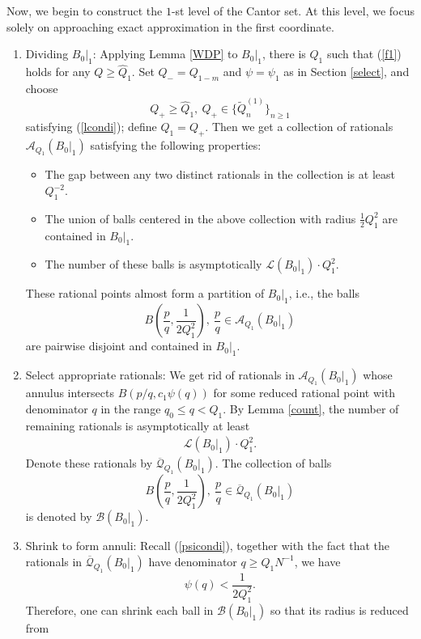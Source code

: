 \documentclass[11pt]{amsart}
\numberwithin{equation}{section}
\newcommand{\0}{\mathbf{0}}
\theoremstyle{remark}
\begin{document}
{Now, we begin to construct the $1$-st level of the Cantor set. At this level, we focus solely on approaching exact approximation in the first coordinate.
\begin{enumerate}
    \item {Dividing $B_0\vert_1$}: Applying Lemma \ref{WDP} to $B_0\vert_1$, there is $\widehat{Q}_1$ such that (\ref{f1}) holds for any $Q\ge \widehat{Q}_1$. Set $Q_-=Q_{1-m}$ and $\psi=\psi_1$ as in Section \ref{select}, and choose
$$Q_+\ge \widehat{Q}_1,\ Q_+\in\{\widetilde{Q}_n^{(1)}\}_{n\ge 1}$$
satisfying (\ref{lcondi}); define $Q_1=Q_+$. Then we get a collection of rationals $\mathcal{A}_{Q_1}(B_{0}\vert_1)$ satisfying the following properties:
        \begin{itemize}
  \item The gap between any two distinct rationals in the collection is at least $Q_1^{-2}$.
     \item The union of balls centered in the above collection with radius $\frac12Q_1^2$ are contained in $B_{0}\vert_1$.
    \item The number of these balls is asymptotically $\mathcal{L}(B_{0}\vert_1)\cdot Q_1^2$.
\end{itemize}
 These rational points almost form a partition of $B_0\vert_1$, i.e., the balls $$B\left(\frac{p}{q},\frac{1}{2Q_1^2}\right),\ \frac{p}{q}\in \mathcal{A}_{Q_1}(B_{0}\vert_1)$$
 are pairwise disjoint and contained in $B_{0}\vert_1$.
    \item {Select appropriate rationals}: We get rid of rationals in $\mathcal{A}_{Q_1}(B_{0}\vert_1)$ whose annulus intersects $B(p/q,c_1\psi(q))$ for some reduced rational point with denominator $q$ in the range $q_0\le q< Q_1$. By Lemma \ref{count}, the number of remaining rationals is asymptotically at least
    \begin{align}\label{ranumber}
   \mathcal{L}(B_{0}\vert_1)\cdot Q_1^2.
\end{align}
    Denote these rationals by $\overline{\mathcal{Q}}_{Q_1}(B_{0}\vert_1)$. The collection of balls
$$B\left(\frac{p}{q},\frac{1}{2Q_1^2}\right),\ \frac{p}{q}\in \overline{\mathcal{Q}}_{Q_1}(B_{0}\vert_1)$$
is denoted by $\mathcal{B}(B_0\vert_1)$. %
    \item Shrink to form annuli: Recall (\ref{psicondi}), together with the fact that the rationals in $\overline{\mathcal{Q}}_{Q_1}(B_0\vert_1)$ have denominator $q\ge Q_1N^{-1}$, we have
    $$\psi(q)<\frac{1}{2Q_1^2}.$$
    Therefore, one can shrink each ball in $\mathcal{B}(B_0\vert_1)$ so that its radius is reduced from

\end{enumerate}}
\end{document}
